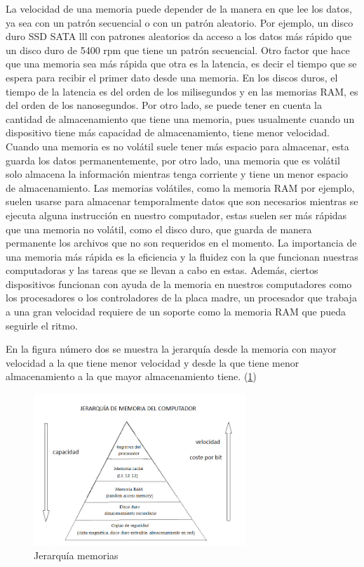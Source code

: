 \documentclass{article}
\begin{document}
La velocidad de una memoria puede depender de la manera en que lee los datos, ya sea con un patrón secuencial o con un patrón aleatorio. Por ejemplo, un disco duro SSD SATA lll con patrones aleatorios da acceso a los datos más rápido que un disco duro de 5400 rpm que tiene un patrón secuencial.
Otro factor que hace que una memoria sea más rápida que otra es la latencia, es decir el tiempo que se espera para recibir el primer dato desde una memoria. En los discos duros, el tiempo de la latencia es del orden de los milisegundos y en las memorias RAM, es del orden de los nanosegundos.
Por otro lado, se puede tener en cuenta la cantidad de almacenamiento que tiene una memoria, pues usualmente cuando un dispositivo tiene más capacidad de almacenamiento, tiene menor velocidad. Cuando una memoria es no volátil suele tener más espacio para almacenar, esta guarda los datos permanentemente, por otro lado, una memoria que es volátil solo almacena la información mientras tenga corriente y tiene un menor espacio de almacenamiento. Las memorias volátiles, como la memoria RAM por ejemplo, suelen usarse para almacenar temporalmente datos que son necesarios mientras se ejecuta alguna instrucción en nuestro computador, estas suelen ser más rápidas que una memoria no volátil, como el disco duro, que guarda de manera permanente los archivos que no son requeridos en el momento.
La importancia de una memoria más rápida es la eficiencia y la fluidez con la que funcionan nuestras computadoras y las tareas que se llevan a cabo en estas. Además, ciertos dispositivos funcionan con ayuda de la memoria en nuestros computadores como los procesadores o  los controladores de la placa madre, un procesador que trabaja a una gran velocidad requiere de un soporte como la memoria RAM que pueda seguirle el ritmo.\cite{Alelua}


En la figura número dos se muestra la jerarquía desde la memoria con mayor velocidad a la que tiene menor velocidad y desde la que tiene menor almacenamiento a la que mayor almacenamiento tiene. (\ref{fig:jerarquia})

\begin{figure}[h]
\includegraphics[width=8cm]{jerarquia.png}
\centering
\caption{Jerarquía memorias}
\label{fig:jerarquia}
\end{figure}
\end{document}
